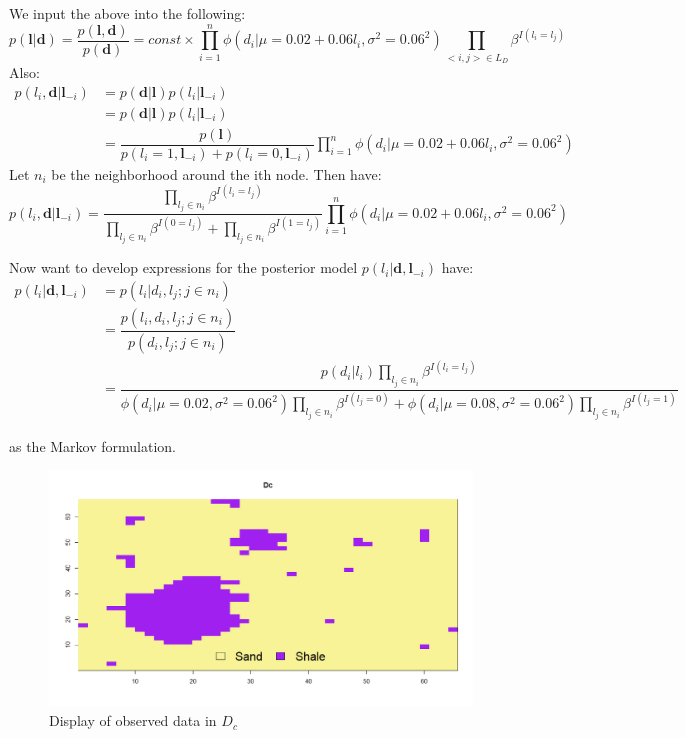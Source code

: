 \documentclass{article}
\newcommand{\vect}[1]{\ensuremath{\boldsymbol{\mathbf{#1}}}}
\begin{document}
	We input the above into the following:
	\begin{equation}
		p(\vect l | \vect d) = \dfrac{p(\vect l, \vect d)}{p(\vect d)} = const  \times \prod_{i=1}^{n}  \phi(d_i |\mu = 0.02 + 0.06l_i, \sigma^2 = 0.06^2) \prod_{<i, j>\in L_D} \beta^{I(l_i = l_j)}
	\end{equation}
	Also: 
	\begin{equation}
	\begin{split}
		p(l_i, \vect d | \vect l_{-i}) &= p(\vect d | \vect l)p(l_i | \vect l_{-i}) \\ &= p(\vect d | \vect l)p(l_i | \vect l_{-i}) \\ 
		&= 	\dfrac{p(\vect l)}{p(l_i = 1, \vect l_{-i}) +p(l_i = 0, \vect l_{-i})} 	\prod_{i=1}^{n}  \phi(d_i |\mu = 0.02 + 0.06l_i, \sigma^2 = 0.06^2) 
	\end{split}
	\end{equation}
	Let $n_i$ be the neighborhood around the ith node. Then have:
	\begin{equation}
		p(l_i, \vect d | \vect l_{-i}) = \dfrac{\prod_{l_j \in n_i}\beta^{I(l_i = l_j)}}{\prod_{l_j \in n_i}\beta^{I(0 = l_j)} + \prod_{l_j \in n_i}\beta^{I(1 = l_j)}} 	\prod_{i=1}^{n}  \phi(d_i |\mu = 0.02 + 0.06l_i, \sigma^2 = 0.06^2) 
	\end{equation} 

	
	Now want to develop expressions for the posterior model  $p(l_i | \vect d, \vect l_{-i})$ have:
	\begin{equation}
		\begin{split}
		p(l_i | \vect d, \vect l_{-i}) &= p(l_i | d_i, l_{j} ; j \in n_i) 
		\\ &= \dfrac{p(l_i, d_i, l_j ; j \in n_i)}{p(d_i, l_j ; j \in n_i)}
		\\ &= \dfrac{p(d_i | l_i)\prod_{l_j \in n_i}\beta^{I(l_i = l_j)}}{\phi(d_i|\mu = 0.02, \sigma^2 = 0.06^2)\prod_{l_j \in n_i}\beta^{I(l_j = 0)} + \phi(d_i|\mu = 0.08, \sigma^2 = 0.06^2)\prod_{l_j \in n_i}\beta^{I(l_j = 1)}} 
		\end{split}		
	\end{equation} 
	
	as the Markov formulation. 
	
	\begin{figure}[h]	
		\begin{center} 
			\includegraphics[scale=0.48]{figure5.png}
		\end{center}
		\caption{Display of observed data in $D_c$ }
		\label{fig:1c1} 
	\end{figure}
\end{document}
